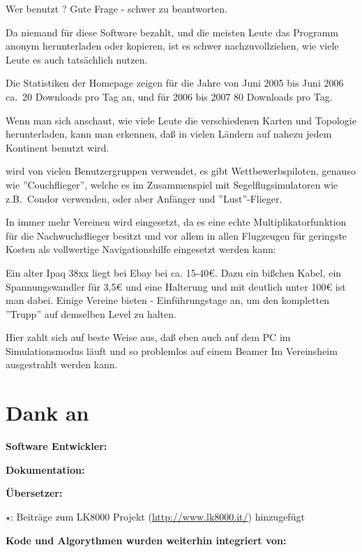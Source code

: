Wer benutzt \xc? Gute Frage - schwer zu beantworten. 

Da niemand für diese Software bezahlt, und die meisten Leute das Programm 
anonym herunterladen oder kopieren, ist es schwer nachzuvollziehen,  wie viele Leute es auch tatsächlich nutzen.

Die Statistiken der Homepage zeigen für die Jahre von Juni 2005 bis Juni 2006 ca.\ 20 Downloads pro Tag an, und für 2006 bis 2007 80 Downloads pro Tag.

Wenn man sich anschaut, wie viele Leute die verschiedenen Karten und Topologie  herunterladen, kann man erkennen, daß \xc in vielen Ländern auf nahezu jedem Kontinent benutzt wird.

\xc wird von vielen Benutzergruppen verwendet, es gibt Wettbewerbspiloten, genauso wie ''Couchflieger'',
welche es im Zusammenspiel mit Segelflugsimulatoren wie z.B.\ Condor verwenden, oder aber Anfänger und ''Lust''-Flieger.

In immer mehr Vereinen wird \xc eingesetzt, da es eine echte Multiplikatorfunktion für die Nachwuchsflieger besitzt  und vor allem
in allen Flugzeugen für geringste Kosten als vollwertige Navigationshilfe eingesetzt werden kann:


Ein alter Ipaq 38xx liegt bei Ebay bei ca. 15-40\euro{}. Dazu ein bißchen Kabel, ein Spannungswandler für 3,5\euro{} und eine Halterung 
und mit deutlich unter 100\euro{} ist man dabei.  
Einige Vereine bieten \xc - Einführungstage an, um den kompletten ''Trupp'' auf demselben Level zu halten.

Hier zahlt sich auf beste Weise aus, daß \xc eben auch auf dem PC im Simulationsmodus läuft und so problemlos auf einem Beamer Im Vereinsheim 
ausgestrahlt werden kann.


\section{Dank an}\label{sec:credits}

{\large\bf Software Entwickler:}
\begin{compactitem}
  
\end{compactitem}

\vspace{1em}
{\large\bf Dokumentation:}
\begin{compactitem}
  
\end{compactitem}

\vspace{1em}
{\large\bf Übersetzer:}
\begin{compactitem}
  
\end{compactitem}

$\star$:  Beiträge zum  LK8000 Projekt (\url{http://www.lk8000.it/}) hinzugefügt

\vspace{1em}
{\large\bf Kode und Algorythmen wurden weiterhin integriert von:}
\begin{description}
  
\end{description}

